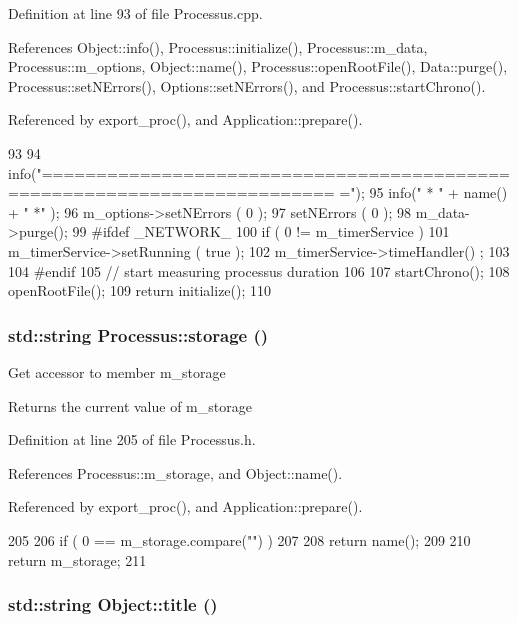 Definition at line 93 of file Processus.cpp.

References Object::info(), Processus::initialize(), Processus::m\_\-data, Processus::m\_\-options, Object::name(), Processus::openRootFile(), Data::purge(), Processus::setNErrors(), Options::setNErrors(), and Processus::startChrono().

Referenced by export\_\-proc(), and Application::prepare().


\begin{DoxyCode}
93                                       {
94   info("=========================================================================
      =");
95   info("   * " + name() + " *" );
96   m_options->setNErrors ( 0 );
97   setNErrors ( 0 );
98   m_data->purge();
99 #ifdef _NETWORK_
100   if ( 0 != m_timerService ){
101     m_timerService->setRunning ( true );
102     m_timerService->timeHandler() ;
103   }
104 #endif
105   // start measuring processus duration
106   
107   startChrono();
108   openRootFile();
109   return initialize();
110 }
\end{DoxyCode}
\hypertarget{classProcessus_a33fa1a0b54a636e5cdd680669fd9ea51}{
\subsubsection[{storage}]{\setlength{\rightskip}{0pt plus 5cm}std::string Processus::storage ()}}
\label{classProcessus_a33fa1a0b54a636e5cdd680669fd9ea51}
Get accessor to member m\_\-storage \begin{DoxyReturn}{Returns}
the current value of m\_\-storage 
\end{DoxyReturn}


Definition at line 205 of file Processus.h.

References Processus::m\_\-storage, and Object::name().

Referenced by export\_\-proc(), and Application::prepare().


\begin{DoxyCode}
205                        {
206     if ( 0 == m_storage.compare("") )
207     {
208       return name();
209     }
210     return m_storage;
211   }
\end{DoxyCode}
\hypertarget{classObject_a73a0f1a41828fdd8303dd662446fb6c3}{
\subsubsection[{title}]{\setlength{\rightskip}{0pt plus 5cm}std::string Object::title ()}}
\label{classObject_a73a0f1a41828fdd8303dd662446fb6c3}


